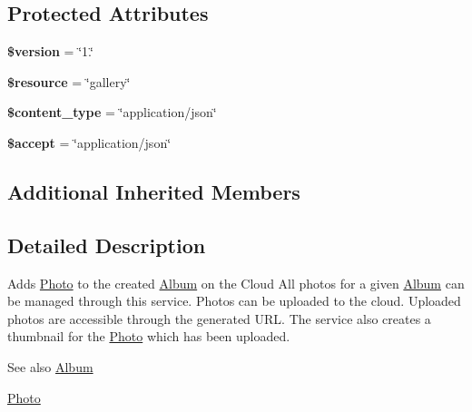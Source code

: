 \subsection*{Protected Attributes}
\begin{DoxyCompactItemize}
\item 
\hypertarget{class_photo_service_a17c8948c68aa44fa9961ae169b6a8961}{{\bfseries \$version} = \char`\"{}1.\char`\"{}}\label{class_photo_service_a17c8948c68aa44fa9961ae169b6a8961}

\item 
\hypertarget{class_photo_service_abd4c7b8b084214b8d2533ba07fce6b83}{{\bfseries \$resource} = \char`\"{}gallery\char`\"{}}\label{class_photo_service_abd4c7b8b084214b8d2533ba07fce6b83}

\item 
\hypertarget{class_photo_service_ae754d6373f275e781f47c8bc9b994b6d}{{\bfseries \$content\+\_\+type} = \char`\"{}application/json\char`\"{}}\label{class_photo_service_ae754d6373f275e781f47c8bc9b994b6d}

\item 
\hypertarget{class_photo_service_a75fc18c4ff06288ff9fdf8aba9bd1081}{{\bfseries \$accept} = \char`\"{}application/json\char`\"{}}\label{class_photo_service_a75fc18c4ff06288ff9fdf8aba9bd1081}

\end{DoxyCompactItemize}
\subsection*{Additional Inherited Members}


\subsection{Detailed Description}
Adds \hyperlink{class_photo}{Photo} to the created \hyperlink{class_album}{Album} on the Cloud All photos for a given \hyperlink{class_album}{Album} can be managed through this service. Photos can be uploaded to the cloud. Uploaded photos are accessible through the generated U\+R\+L. The service also creates a thumbnail for the \hyperlink{class_photo}{Photo} which has been uploaded.

\begin{DoxySeeAlso}{See also}
\hyperlink{class_album}{Album} 

\hyperlink{class_photo}{Photo} 
\end{DoxySeeAlso}


